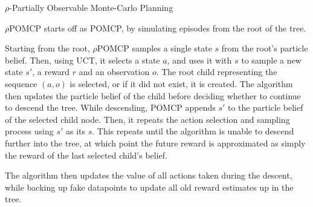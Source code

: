 \begin{algorithm}[H]
    \caption{$\rho$-Partially Observable Monte-Carlo Planning}
\begin{multicols}{2}


    \setcounter{AlgoLine}{0}
\end{multicols}
\end{algorithm}

$\rho$POMCP starts off as POMCP, by simulating episodes from the root of the tree.

Starting from the root, $\rho$POMCP samples a single state $s$ from the root's particle belief.
Then, using UCT, it selects a state $a$, and uses it with $s$ to sample a new state $s'$, a reward
$r$ and an observation $o$. The root child representing the sequence $(a,o)$ is selected, or if it
did not exist, it is created. The algorithm then updates the particle belief of the child before
deciding whether to continue to descend the tree. While descending, POMCP appends $s'$ to the
particle belief of the selected child node. Then, it repeats the action selection and sampling
process using $s'$ as its $s$. This repeats until the algorithm is unable to descend further into
the tree, at which point the future reward is approximated as simply the reward of the last
selected child's belief.

The algorithm then updates the value of all actions taken during the descent, while backing up fake
datapoints to update all old reward estimates up in the tree.

